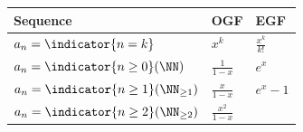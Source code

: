 \begin{longtable}[]{@{}lll@{}}
\toprule
\begin{minipage}[b]{0.30\columnwidth}\raggedright
Sequence\strut
\end{minipage} & \begin{minipage}[b]{0.30\columnwidth}\raggedright
OGF\strut
\end{minipage} & \begin{minipage}[b]{0.30\columnwidth}\raggedright
EGF\strut
\end{minipage}\tabularnewline
\midrule
\endhead
\begin{minipage}[t]{0.30\columnwidth}\raggedright
\(a_n = \indicator{n=k}\)\strut
\end{minipage} & \begin{minipage}[t]{0.30\columnwidth}\raggedright
\(x^k\)\strut
\end{minipage} & \begin{minipage}[t]{0.30\columnwidth}\raggedright
\(\frac{x^k}{k!}\)\strut
\end{minipage}\tabularnewline
\begin{minipage}[t]{0.30\columnwidth}\raggedright
\(a_n = \indicator{n \geq 0} (\NN)\)\strut
\end{minipage} & \begin{minipage}[t]{0.30\columnwidth}\raggedright
\(\frac 1 {1-x}\)\strut
\end{minipage} & \begin{minipage}[t]{0.30\columnwidth}\raggedright
\(e^x\)\strut
\end{minipage}\tabularnewline
\begin{minipage}[t]{0.30\columnwidth}\raggedright
\(a_n = \indicator{n \geq 1} (\NN_{\geq 1})\)\strut
\end{minipage} & \begin{minipage}[t]{0.30\columnwidth}\raggedright
\(\frac x {1-x}\)\strut
\end{minipage} & \begin{minipage}[t]{0.30\columnwidth}\raggedright
\(e^x - 1\)\strut
\end{minipage}\tabularnewline
\begin{minipage}[t]{0.30\columnwidth}\raggedright
\(a_n = \indicator{n \geq 2} (\NN_{\geq 2})\)\strut
\end{minipage} & \begin{minipage}[t]{0.30\columnwidth}\raggedright
\(\frac {x^2} {1-x}\)\strut
\end{minipage} & \begin{minipage}[t]{0.30\columnwidth}\raggedright

\end{minipage}
\end{longtable}
